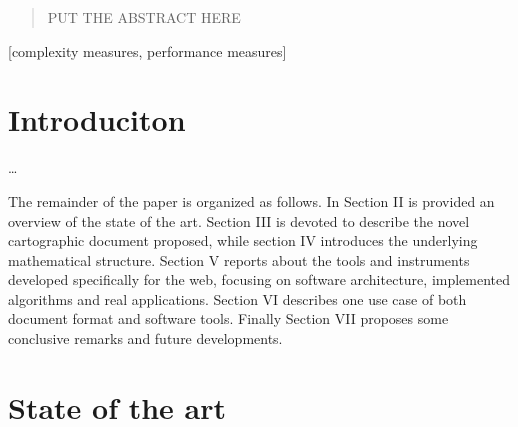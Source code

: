\documentclass{sig-alternate}
\begin{document}
\date{30 July 1999}

\maketitle
\begin{abstract}
PUT THE ABSTRACT HERE
\end{abstract}

[complexity measures, performance measures]



\section{Introduciton}\label{introduciton}

\ldots{}

The remainder of the paper is organized as follows. In Section II is provided an overview of the state of the art. Section III is devoted to describe the novel cartographic document proposed, while section IV introduces the underlying mathematical structure. Section V reports about the tools and instruments developed specifically for the web, focusing on software architecture, implemented algorithms and real applications. Section VI describes one use case of both document format and software tools. Finally Section VII proposes some conclusive remarks and future developments.


\section{State of the art}\label{state-of-the-art}
\end{document}
